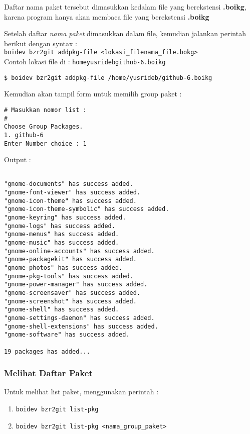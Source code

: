 {\noindent
Daftar nama paket tersebut dimasukkan kedalam file yang berekstensi \textbf{.boikg}, karena program hanya akan membaca file yang berekstensi \textbf{.boikg}

\noindent
Setelah daftar \textit{nama paket} dimasukkan dalam file, kemudian jalankan perintah berikut dengan syntax :\\ {\small \texttt{boidev bzr2git addpkg-file <lokasi\_file\/nama\_file.bokg>}}\\
Contoh lokasi file di : {\small \texttt{\/home\/yusrideb\/github-6.boikg}}

\begin{lstlisting}[language=ShellBash]
$ boidev bzr2git addpkg-file /home/yusrideb/github-6.boikg
\end{lstlisting}

\noindent
Kemudian akan tampil form untuk memilih group paket :

\begin{lstlisting}[language=ShellBash]
# Masukkan nomor list :
#
Choose Group Packages.
1. github-6
Enter Number choice : 1
\end{lstlisting}

\noindent
Output :

\begin{lstlisting}[language=ShellBash]

"gnome-documents" has success added.
"gnome-font-viewer" has success added.
"gnome-icon-theme" has success added.
"gnome-icon-theme-symbolic" has success added.
"gnome-keyring" has success added.
"gnome-logs" has success added.
"gnome-menus" has success added.
"gnome-music" has success added.
"gnome-online-accounts" has success added.
"gnome-packagekit" has success added.
"gnome-photos" has success added.
"gnome-pkg-tools" has success added.
"gnome-power-manager" has success added.
"gnome-screensaver" has success added.
"gnome-screenshot" has success added.
"gnome-shell" has success added.
"gnome-settings-daemon" has success added.
"gnome-shell-extensions" has success added.
"gnome-software" has success added.

19 packages has added...

\end{lstlisting}

\subsubsection{Melihat Daftar Paket}
\noindent
Untuk melihat list paket, menggunakan perintah : 
\begin{enumerate}
	\item {\small \texttt{boidev bzr2git list-pkg}}
	\item {\small \texttt{boidev bzr2git list-pkg <nama\_group\_paket>}}
\end{enumerate}

}
